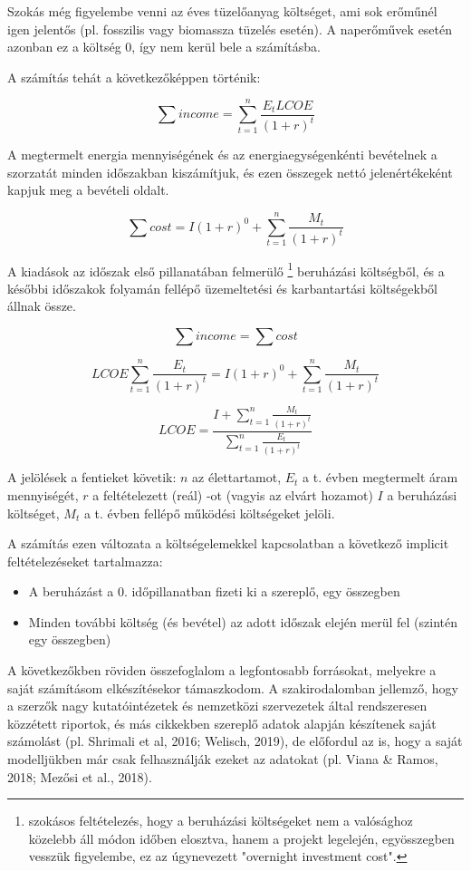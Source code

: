 \documentclass[twoside, magyar, showtrims]{corvinusphd}
\theoremstyle{plain}
\theoremstyle{remark}
\theoremstyle{definition}
\begin{document}
Szokás még figyelembe venni az éves tüzelőanyag költséget,
ami sok erőműnél igen jelentős (pl. fosszilis vagy biomassza tüzelés esetén).
A naperőművek esetén azonban ez a költség 0,
így nem kerül bele a számításba.

A számítás tehát a következőképpen történik:

\[
        \sum income = \sum_{t=1}^n\frac{E_t LCOE}{(1+r)^t}
\]

A megtermelt energia mennyiségének és 
az energiaegységenkénti bevételnek a
szorzatát minden időszakban kiszámítjuk,
és ezen összegek nettó jelenértékeként
kapjuk meg a bevételi oldalt.

\[
        \sum cost = I (1+r)^0 + \sum_{t=1}^n\frac{M_t}{(1+r)^t}
\]

A kiadások az időszak első pillanatában felmerülő
\footnote{szokásos feltételezés, hogy a beruházási költségeket
nem a valósághoz közelebb áll módon időben elosztva,
hanem a projekt legelején, egyösszegben vesszük
figyelembe, ez az úgynevezett "overnight investment cost".}
beruházási költségből, és a későbbi időszakok folyamán
fellépő üzemeltetési és karbantartási költségekből állnak össze.

\[
        \sum income = \sum cost
\]

\[
LCOE \sum_{t=1}^n\frac{E_t}{(1+r)^t} =  I (1+r)^0 + \sum_{t=1}^n\frac{M_t}{(1+r)^t}
\]

\[
LCOE = \frac{ I + \sum_{t=1}^n\frac{M_t}{(1+r)^t}}{\sum_{t=1}^n\frac{E_t}{(1+r)^t} }
\]


A jelölések a fentieket követik: $n$ az élettartamot,
$E_t$ a t. évben megtermelt áram mennyiségét,
$r$ a feltételezett (reál) -ot (vagyis az elvárt hozamot)
$I$ a beruházási költséget, $M_t$ a t. évben fellépő működési költségeket jelöli.

A számítás ezen változata a költségelemekkel kapcsolatban
a következő implicit feltételezéseket tartalmazza:
\begin{itemize}
    \item 
    A beruházást a 0. időpillanatban fizeti ki a szereplő,
egy összegben
    \item
    Minden további költség (és bevétel) az adott időszak elején merül fel (szintén egy összegben)
\end{itemize}

A következőkben röviden összefoglalom a legfontosabb forrásokat,
melyekre a saját  számításom elkészítésekor támaszkodom.
A szakirodalomban jellemző, hogy a szerzők nagy kutatóintézetek
és nemzetközi szervezetek által rendszeresen közzétett riportok,
és más cikkekben szereplő adatok alapján készítenek
saját számolást (pl. Shrimali et al, 2016; Welisch, 2019),
de előfordul az is, hogy a saját modelljükben
már csak felhasználják ezeket az adatokat
(pl. Viana \& Ramos, 2018; Mezősi et al., 2018).
\end{document}
